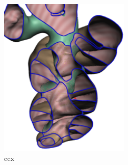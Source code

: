\documentclass[10pt]{article}
\begin{document}
\begin{figure}[H]
\centering
\includegraphics[height=3in]{cochleacx}
\caption{ccx}
\label{ccx}
\end{figure} 
\end{document}
